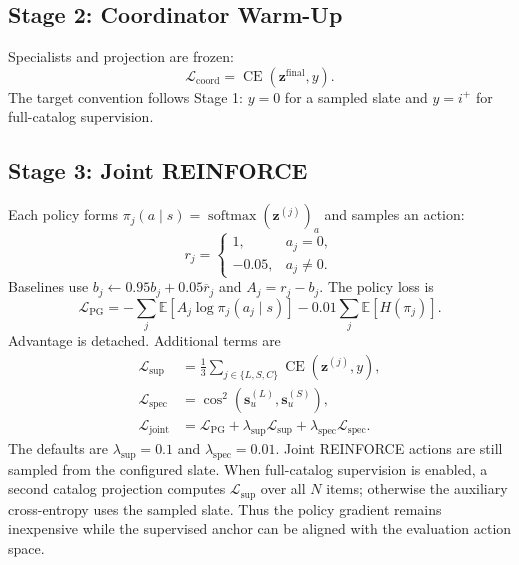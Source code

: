 \documentclass[11pt,a4paper]{article}
\newcommand{\softmax}{\operatorname{softmax}}
\begin{document}
\subsection{Stage 2: Coordinator Warm-Up}

Specialists and projection are frozen:
\begin{equation}
  \mathcal L_{\mathrm{coord}}
  =
  \operatorname{CE}(\bm z^{\mathrm{final}},y).
\end{equation}
The target convention follows Stage 1: $y=0$ for a sampled slate and $y=i^+$
for full-catalog supervision.

\subsection{Stage 3: Joint REINFORCE}

Each policy forms $\pi_j(a\mid s)=\softmax(\bm z^{(j)})_a$ and samples an action:
\begin{equation}
  r_j=
  \begin{cases}
    1,&a_j=0,\\
    -0.05,&a_j\neq0.
  \end{cases}
\end{equation}
Baselines use $b_j\leftarrow0.95b_j+0.05\overline r_j$ and $A_j=r_j-b_j$. The policy loss is
\begin{equation}
  \mathcal L_{\mathrm{PG}}
  =
  -\sum_j\mathbb E[A_j\log\pi_j(a_j\mid s)]
  -0.01\sum_j\mathbb E[H(\pi_j)].
\end{equation}
Advantage is detached. Additional terms are
\begin{align}
  \mathcal L_{\mathrm{sup}}
  &=
  \frac13\sum_{j\in\{L,S,C\}}\operatorname{CE}(\bm z^{(j)},y),\\
  \mathcal L_{\mathrm{spec}}
  &=
  \operatorname{cos}^2(\bm s_u^{(L)},\bm s_u^{(S)}),\\
  \mathcal L_{\mathrm{joint}}
  &=
  \mathcal L_{\mathrm{PG}}
  +\lambda_{\mathrm{sup}}\mathcal L_{\mathrm{sup}}
  +\lambda_{\mathrm{spec}}\mathcal L_{\mathrm{spec}}.
\end{align}
The defaults are $\lambda_{\mathrm{sup}}=0.1$ and
$\lambda_{\mathrm{spec}}=0.01$. Joint REINFORCE actions are still sampled
from the configured slate. When full-catalog supervision is enabled, a second
catalog projection computes $\mathcal L_{\mathrm{sup}}$ over all $N$ items;
otherwise the auxiliary cross-entropy uses the sampled slate. Thus the policy
gradient remains inexpensive while the supervised anchor can be aligned with
the evaluation action space.
\end{document}
